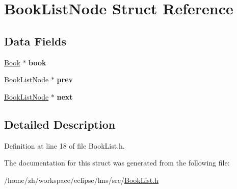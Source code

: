 \hypertarget{structBookListNode}{\section{Book\-List\-Node Struct Reference}
\label{structBookListNode}
}
\subsection*{Data Fields}
\begin{DoxyCompactItemize}
\item 
\hypertarget{structBookListNode_a5e41211d73d778767175b37fcd1e8c71}{\hyperlink{structBook}{Book} $\ast$ {\bfseries book}}\label{structBookListNode_a5e41211d73d778767175b37fcd1e8c71}

\item 
\hypertarget{structBookListNode_af2cb8bf050fd9f9639b8949f2db578e2}{\hyperlink{structBookListNode}{Book\-List\-Node} $\ast$ {\bfseries prev}}\label{structBookListNode_af2cb8bf050fd9f9639b8949f2db578e2}

\item 
\hypertarget{structBookListNode_a3f892f06ca83fe53b9748925dfa01d57}{\hyperlink{structBookListNode}{Book\-List\-Node} $\ast$ {\bfseries next}}\label{structBookListNode_a3f892f06ca83fe53b9748925dfa01d57}

\end{DoxyCompactItemize}


\subsection{Detailed Description}


Definition at line 18 of file Book\-List.\-h.



The documentation for this struct was generated from the following file\-:\begin{DoxyCompactItemize}
\item 
/home/zh/workspace/eclipse/lms/src/\hyperlink{BookList_8h}{Book\-List.\-h}\end{DoxyCompactItemize}
